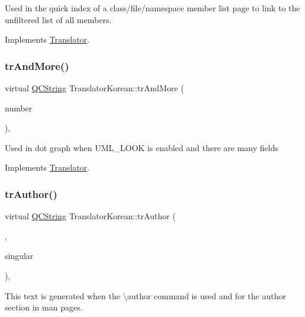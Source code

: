 Used in the quick index of a class/file/namespace member list page to link to the unfiltered list of all members. 

Implements \mbox{\hyperlink{class_translator}{Translator}}.

\mbox{\label{class_translator_korean_abfd2acd5bfd7852b8184b7a9c630ffc4}} 
\subsubsection{\texorpdfstring{trAndMore()}{trAndMore()}}
{\footnotesize\ttfamily virtual \mbox{\hyperlink{class_q_c_string}{Q\+C\+String}} Translator\+Korean\+::tr\+And\+More (\begin{DoxyParamCaption}\item[{const \mbox{\hyperlink{class_q_c_string}{Q\+C\+String}} \&}]{number }\end{DoxyParamCaption})\hspace{0.3cm}{\ttfamily [inline]}, {\ttfamily [virtual]}}

Used in dot graph when U\+M\+L\+\_\+\+L\+O\+OK is enabled and there are many fields 

Implements \mbox{\hyperlink{class_translator}{Translator}}.

\mbox{\label{class_translator_korean_a7a9cc0313f8ad406e6339ea01dd05562}} 
\subsubsection{\texorpdfstring{trAuthor()}{trAuthor()}}
{\footnotesize\ttfamily virtual \mbox{\hyperlink{class_q_c_string}{Q\+C\+String}} Translator\+Korean\+::tr\+Author (\begin{DoxyParamCaption}\item[{bool}]{,  }\item[{bool}]{singular }\end{DoxyParamCaption})\hspace{0.3cm}{\ttfamily [inline]}, {\ttfamily [virtual]}}

This text is generated when the \textbackslash{}author command is used and for the author section in man pages. 

